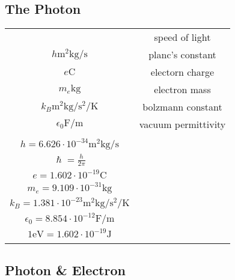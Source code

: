 \documentclass{article}
\begin{document}
\begin{twocolumn} 



\section{The Photon}  

\begin{donotbrake}
\begin{tabular}{cc}
	\begin{dtabular}
		
		$c \si{\metre \per \second}$ & speed of light \\
		$h \si{\metre \squared \kilogram \per \second}$ & planc's constant \\
		$e \si{\coulomb}$ & electorn charge \\
		$m_e \si{\kilogram}$ & electron mass \\
		$k_B \si{\metre \squared \kilogram \per \second \squared \per \kelvin}$ & bolzmann constant \\
		$\epsilon_0 \si{\farad \per \metre}$ & vacuum permittivity \\
		
	\end{dtabular}

	\begin{mtabular}{c}
		$c = 2.998 \cdot 10^8 \si{\metre \per \second}$ \\
		$h = 6.626 \cdot 10^{-34} \si{\metre \squared \kilogram \per \second}$ \\
		$\hslash = \frac{h}{2\pi}$ \\
		$e = 1.602 \cdot 10^{-19} \si{\coulomb}$ \\
		$m_e = 9.109 \cdot 10^{-31} \si{\kilogram}$ \\
		$k_B = 1.381 \cdot 10^{-23} \si{\metre \squared \kilogram \per \second \squared \per \kelvin}$ \\
		$\epsilon_0 = 8.854 \cdot 10^{-12} \si{\farad \per \meter}$ \\
		$1 \si{\electronvolt} = 1.602 \cdot 10^{-19} \si{\joule}$ \\
	\end{mtabular}
\end{tabular}
\end{donotbrake}

\begin{donotbrake}
\subsection{Photon \& Electron}


\end{donotbrake}
\end{twocolumn}
\end{document}
